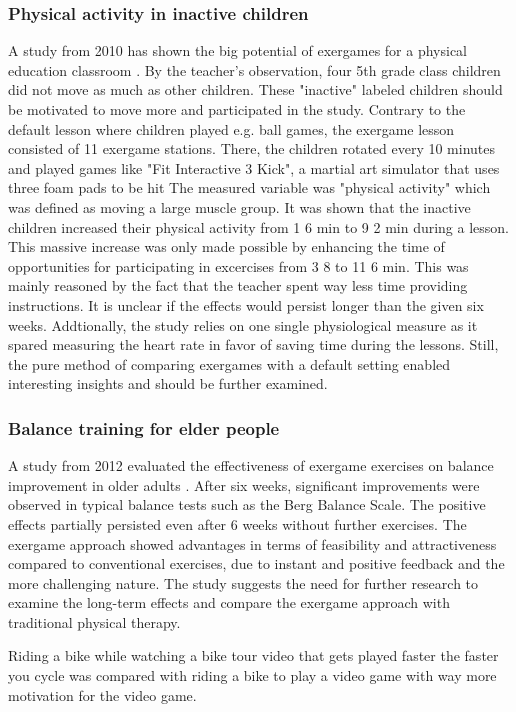 \subsubsection{Physical activity in inactive children}
A study from 2010 has shown the big potential of exergames for a physical education classroom \cite{fogel2010effects}. By the teacher's observation, four 5th grade class children did not move as much as other children. These "inactive" labeled children should be motivated to move more and participated in the study. 
Contrary to the default lesson where children played e.g. ball games, the exergame lesson consisted of 11 exergame stations. There, the children rotated every 10 minutes and played games like "Fit Interactive 3 Kick", a martial art simulator that uses three foam pads to be hit 
The measured variable was "physical activity" which was defined as moving a large muscle group. It was shown that the inactive children increased their physical activity from 1 6 min to 9 2 min during a lesson. This massive increase was only made possible by enhancing the time of opportunities for participating in excercises from 3 8 to 11 6 min. This was mainly reasoned by the fact that the teacher spent way less time providing instructions. 
It is unclear if the effects would persist longer than the given six weeks. Addtionally, the study relies on one single physiological measure as it spared measuring the heart rate in favor of saving time during the lessons. Still, the pure method of comparing exergames with a default setting enabled interesting insights and should be further examined.

\subsubsection{Balance training for elder people}
A study from 2012 evaluated the effectiveness of exergame exercises on balance improvement in older adults \cite{lai2013effects}. After six weeks, significant improvements were observed in typical balance tests such as the Berg Balance Scale. The positive effects partially persisted even after 6 weeks without further exercises. The exergame approach showed advantages in terms of feasibility and attractiveness compared to conventional exercises, due to instant and positive feedback and the more challenging nature. The study suggests the need for further research to examine the long-term effects and compare the exergame approach with traditional physical therapy.

Riding a bike while watching a bike tour video that gets played faster the faster you cycle was compared with riding a bike to play a video game with way more motivation for the video game. \cite{hardy2011adoption}


